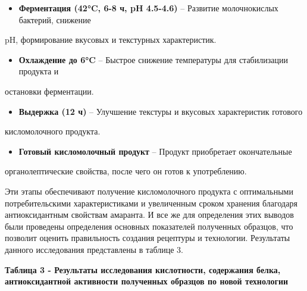 {\begin{itemize}
\item
  {\bfseries Ферментация (42°C, 6-8 ч, pH 4.5-4.6)} -- Развитие
  молочнокислых бактерий, снижение
\end{itemize}

pH, формирование вкусовых и текстурных характеристик.

\begin{itemize}
\item
  {\bfseries Охлаждение до 6°C} -- Быстрое снижение температуры для
  стабилизации продукта и
\end{itemize}

остановки ферментации.

\begin{itemize}
\item
  {\bfseries Выдержка (12 ч)} -- Улучшение текстуры и вкусовых
  характеристик готового
\end{itemize}

кисломолочного продукта.

\begin{itemize}
\item
  {\bfseries Готовый кисломолочный продукт} -- Продукт приобретает
  окончательные
\end{itemize}

органолептические свойства, после чего он готов к употреблению.

Эти этапы обеспечивают получение кисломолочного продукта с оптимальными
потребительскими характеристиками и увеличенным сроком хранения
благодаря антиоксидантным свойствам амаранта. И все же для определения
этих выводов были проведены определения основных показателей полученных
образцов, что позволит оценить правильность создания рецептуры и
технологии. Результаты данного исследования представлены в таблице 3.

{\bfseries Таблица 3 - Результаты исследования кислотности, содержания
белка, антиоксидантной активности полученных образцов по новой
технологии}

}
